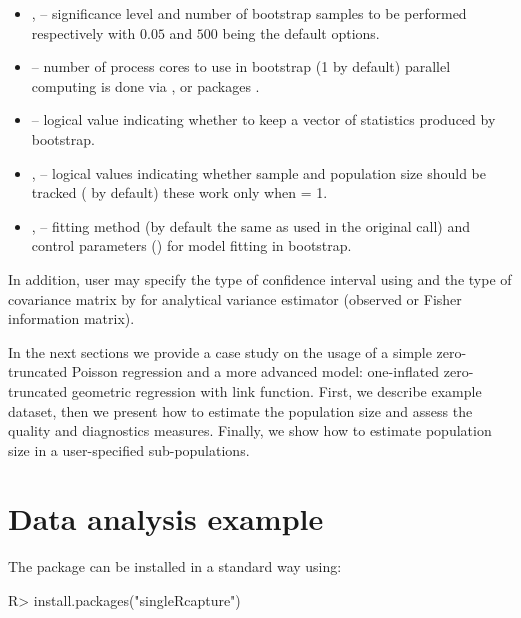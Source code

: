 \documentclass[
]{jss}
\newcommand{\1}{\mathcal{I}} \newcommand{\bZero}{\boldsymbol{0}}
\begin{document}
\begin{itemize}
  \item {},  -- significance level and number of bootstrap samples to be performed respectively with $0.05$ and $500$ being the default options.
  \item {} -- number of process cores to use in bootstrap (1 by default) parallel computing is done via  \citep{doParallel},  \citep{foreach} or  packages \citep{parallel}.
  \item {} --  logical value indicating whether to keep a vector of statistics produced by bootstrap.
  \item {},  --  logical values indicating whether sample and population size should be tracked ( by default) these work only when  = 1.
    \item {},  -- fitting method (by default the same as used in the original call) and control parameters () for model fitting in bootstrap.
\end{itemize}

In addition, user may specify the type of confidence interval using
 and the type of covariance matrix by  for
analytical variance estimator (observed or Fisher information matrix).

In the next sections we provide a case study on the usage of a simple
zero-truncated Poisson regression and a more advanced model:
one-inflated zero-truncated geometric regression with 
link function. First, we describe example dataset, then we present how
to estimate the population size and assess the quality and diagnostics
measures. Finally, we show how to estimate population size in a
user-specified sub-populations.

\section{Data analysis example}\label{sec-study}

The package can be installed in a standard way using:

\begin{CodeChunk}
\begin{CodeInput}
R> install.packages("singleRcapture")
\end{CodeInput}
\end{CodeChunk}
\end{document}
